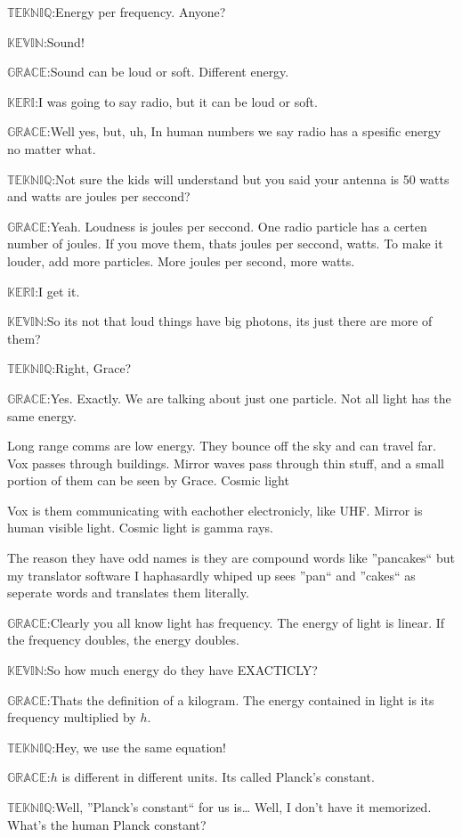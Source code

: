 \documentclass{article}
\newcommand{\gr}{\noindent$\mathbb{GRACE}$:}
\newcommand{\tek}{\noindent$\mathbb{TEKNIQ}$:}
\newcommand{\kev}{\noindent$\mathbb{KEVIN}$:}
\newcommand{\kem}{\noindent$\mathbb{KERI}$:}
\begin{document}
\tek Energy per frequency. Anyone?

\kev Sound!

\gr Sound can be loud or soft. Different energy.

\kem I was going to say radio, but it can be loud or soft.

\gr Well yes, but, uh, In human numbers we say radio has a spesific energy no matter what.

\tek Not sure the kids will understand but you said your antenna is 50 watts and watts are joules per seccond?

\gr Yeah. Loudness is joules per seccond. One radio particle has a certen number of joules. If you move them, thats joules per seccond, watts. To make it louder, add more particles. More joules per second, more watts.

\kem I get it.

\kev So its not that loud things have big photons, its just there are more of them?

\tek Right, Grace?

\gr Yes. Exactly. We are talking about just one particle. Not all light has the same energy.

\tekniq Long range comms are low energy. They bounce off the sky and can travel far. Vox passes through buildings. Mirror waves pass through thin stuff, and a
small portion of them can be seen by Grace. Cosmic light

Vox is them communicating with eachother electronicly, like UHF. Mirror is human visible light. Cosmic light is gamma rays.

The reason they have odd names is they are compound words like ''pancakes`` but my translator software I haphasardly whiped up sees ''pan`` and ''cakes`` as seperate words and translates them literally.

\gr Clearly you all know light has frequency. The energy of light is linear. If the frequency doubles, the energy doubles.

\kev So how much energy do they have EXACTICLY?

\gr Thats the definition of a kilogram. The energy contained in light is its frequency multiplied by $h$.

\tek Hey, we use the same equation!

\gr $h$ is different in different units. Its called Planck's constant.

\tek Well, ''Planck's constant`` for us is\ldots{} Well, I don't have it memorized. What's the human Planck constant?
\end{document}
